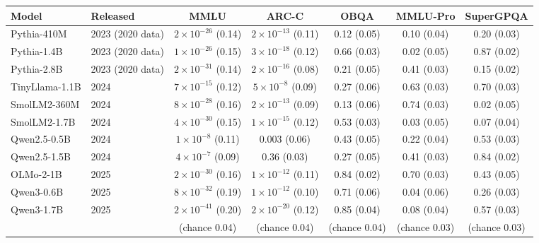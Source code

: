 \begin{tabular}{llccccc}
\toprule
Model & Released & MMLU & ARC-C & OBQA & MMLU-Pro & SuperGPQA\\
\midrule
Pythia-410M & 2023 (2020 data) & \textbf{$2{\times}10^{-26}$} (0.14) & \textbf{$2{\times}10^{-13}$} (0.11) & 0.12 (0.05) & 0.10 (0.04) & 0.20 (0.03)\\
Pythia-1.4B & 2023 (2020 data) & \textbf{$1{\times}10^{-26}$} (0.15) & \textbf{$3{\times}10^{-18}$} (0.12) & 0.66 (0.03) & 0.02 (0.05) & 0.87 (0.02)\\
Pythia-2.8B & 2023 (2020 data) & \textbf{$2{\times}10^{-31}$} (0.14) & \textbf{$2{\times}10^{-16}$} (0.08) & 0.21 (0.05) & 0.41 (0.03) & 0.15 (0.02)\\
TinyLlama-1.1B & 2024 & \textbf{$7{\times}10^{-15}$} (0.12) & \textbf{$5{\times}10^{-8}$} (0.09) & 0.27 (0.06) & 0.63 (0.03) & 0.70 (0.03)\\
SmolLM2-360M & 2024 & \textbf{$8{\times}10^{-28}$} (0.16) & \textbf{$2{\times}10^{-13}$} (0.09) & 0.13 (0.06) & 0.74 (0.03) & 0.02 (0.05)\\
SmolLM2-1.7B & 2024 & \textbf{$4{\times}10^{-30}$} (0.15) & \textbf{$1{\times}10^{-15}$} (0.12) & 0.53 (0.03) & 0.03 (0.05) & 0.07 (0.04)\\
Qwen2.5-0.5B & 2024 & \textbf{$1{\times}10^{-8}$} (0.11) & 0.003 (0.06) & 0.43 (0.05) & 0.22 (0.04) & 0.53 (0.03)\\
Qwen2.5-1.5B & 2024 & \textbf{$4{\times}10^{-7}$} (0.09) & 0.36 (0.03) & 0.27 (0.05) & 0.41 (0.03) & 0.84 (0.02)\\
OLMo-2-1B & 2025 & \textbf{$2{\times}10^{-30}$} (0.16) & \textbf{$1{\times}10^{-12}$} (0.11) & 0.84 (0.02) & 0.70 (0.03) & 0.43 (0.05)\\
Qwen3-0.6B & 2025 & \textbf{$8{\times}10^{-32}$} (0.19) & \textbf{$1{\times}10^{-12}$} (0.10) & 0.71 (0.06) & 0.04 (0.06) & 0.26 (0.03)\\
Qwen3-1.7B & 2025 & \textbf{$2{\times}10^{-41}$} (0.20) & \textbf{$2{\times}10^{-20}$} (0.12) & 0.85 (0.04) & 0.08 (0.04) & 0.57 (0.03)\\
\midrule
 & & (chance 0.04) & (chance 0.04) & (chance 0.04) & (chance 0.03) & (chance 0.03)\\
\bottomrule
\end{tabular}
